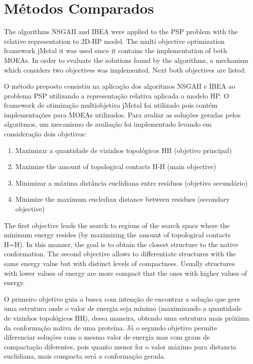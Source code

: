 \documentclass[conference]{IEEEtran}
\begin{document}
\section{Métodos Comparados}

The algorithms NSGAII and IBEA were applied to the PSP problem with the relative representation to 2D-HP model. The multi objective optimization framework jMetal \cite{jMetal} it was used since it contains the implementation of both MOEAs. In order to evaluate the solutions found by the algorithms, a mechanism which considers two objectives was implemented. Next both objectives are listed: 

O método proposto consistiu na aplicação dos algoritmos NSGAII e IBEA ao problema PSP utilizando a representação relativa aplicada o modelo HP. O framework de otimização multiobjetiva jMetal \cite{jMetal} foi utilizado pois contém implementações para MOEAs utilizados. Para avaliar as soluções geradas pelos algoritmos, um mecanismo de avaliação foi implementado levando em consideração dois objetivos:

\begin{enumerate}[I]
	\item{Maximizar a quantidade de vizinhos topológicos HH (objetivo principal)}
	\item{Maximize the amount of topological contacts H-H (main objective)}
	\item{Minimizar a máxima distância euclidiana entre resíduos (objetivo secundário)}
		\item{Minimize the maximum eucledian distance between residues (secondary objective)}
\end{enumerate}

The first objective leads the search to regions of the search space where the minimum energy resides (by maximizing the amount of topological contacts H=H). In this manner, the goal is to obtain the closest structure  to the native conformation. The second objective allows to differentiate structures with the same energy value but with distinct levels of compactness. Usually structures with lower values of energy are more compact that the ones with higher values of energy. 

O primeiro objetivo guia a busca com intenção de encontrar a solução que gere uma estrutura onde o valor de energia seja mínimo (maximizando a quantidade de vizinhos topológicos HH), dessa maneira, obtendo uma estrutura mais próxima da conformação nativa de uma proteína. Já o segundo objetivo permite diferenciar soluções com o mesmo valor de energia mas com graus de compactação diferentes, pois quanto menor for o valor máximo para distancia euclidiana, mais compacta será a conformação gerada.
\end{document}
